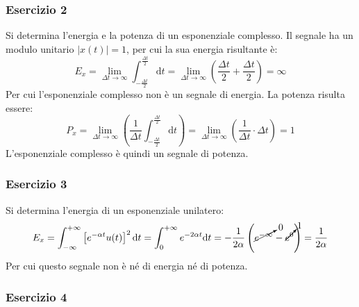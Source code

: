 \documentclass{article}
\newcommand{\df}{\mathrm{d}}
\begin{document}
\subsubsection*{Esercizio 2}

Si determina l'energia e la potenza di un esponenziale complesso. Il segnale ha un modulo unitario $|x(t)|=1$, per cui la sua energia risultante è:
\begin{equation}
    E_x=\lim_{\Delta t\to\infty}\displaystyle\int_{-\frac{\Delta t}{2}}^{\frac{\Delta t}{2}}\df t=\lim_{\Delta t\to\infty}\left(\frac{\Delta t}{2}+\frac{\Delta t}{2}\right)=\infty
\end{equation}
Per cui l'esponenziale complesso non è un segnale di energia. La potenza risulta essere:
\begin{equation}
    P_x=\lim_{\Delta t\to\infty}\displaystyle\left(\frac{1}{\Delta t}\int_{-\frac{\Delta t}{2}}^{\frac{\Delta t}{2}}\df t\right)=\lim_{\Delta t\to\infty}\left(\frac{1}{\Delta t}\cdot\Delta t\right)=1
\end{equation}
L'esponenziale complesso è quindi un segnale di potenza. 

\subsubsection*{Esercizio 3}

Si determina l'energia di un esponenziale unilatero:
\begin{equation}
    E_x=\displaystyle\int_{-\infty}^{+\infty}\left[e^{-\alpha t}u(t)\right]^2\df t=\int_0^{+\infty}e^{-2\alpha t}\df t=-\frac{1}{2\alpha}\left(\cancelto{0}{e^{-\infty}}-\cancelto{1}{e^{0}}\right)=\frac{1}{2\alpha}
\end{equation}
Per cui questo segnale non è né di energia né di potenza. 

\subsubsection*{Esercizio 4}
\end{document}
